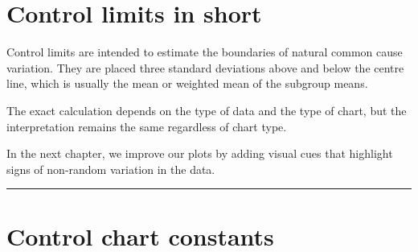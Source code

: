 \documentclass[
]{book}
\begin{document}
\section{Control limits in short}\label{control-limits-in-short}

Control limits are intended to estimate the boundaries of natural common cause variation. They are placed three standard deviations above and below the centre line, which is usually the mean or weighted mean of the subgroup means.

The exact calculation depends on the type of data and the type of chart, but the interpretation remains the same regardless of chart type.

In the next chapter, we improve our plots by adding visual cues that highlight signs of non-random variation in the data.

\begin{center}\rule{0.5\linewidth}{0.5pt}\end{center}

\section*{Control chart constants}\label{chart-constants}
\end{document}
